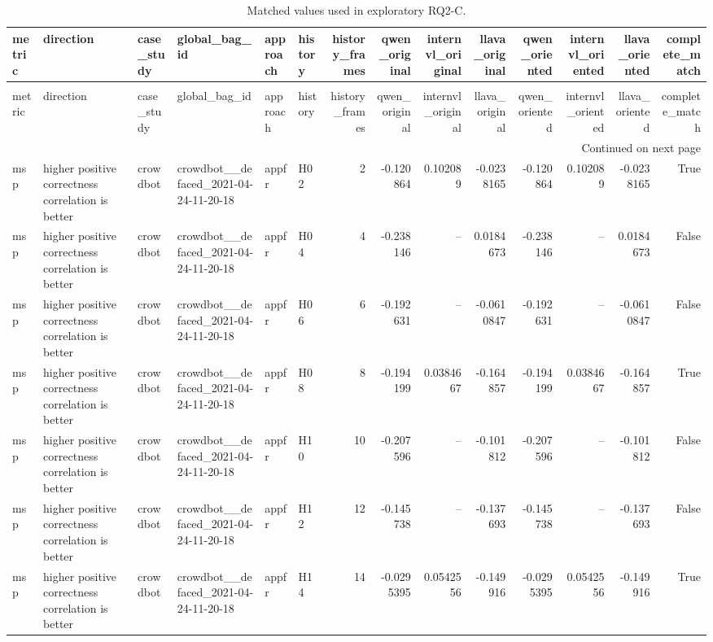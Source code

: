 \begin{longtable}{llllllrrrrrrrr}
\caption{Matched values used in exploratory RQ2-C.} \label{tab:rq2c-matched-values} \\
\toprule
metric & direction & case\_study & global\_bag\_id & approach & history & history\_frames & qwen\_original & internvl\_original & llava\_original & qwen\_oriented & internvl\_oriented & llava\_oriented & complete\_match \\
\midrule
\endfirsthead
\caption[]{Matched values used in exploratory RQ2-C.} \\
\toprule
metric & direction & case\_study & global\_bag\_id & approach & history & history\_frames & qwen\_original & internvl\_original & llava\_original & qwen\_oriented & internvl\_oriented & llava\_oriented & complete\_match \\
\midrule
\endhead
\midrule
\multicolumn{14}{r}{Continued on next page} \\
\midrule
\endfoot
\bottomrule
\endlastfoot
msp & higher positive correctness correlation is better & crowdbot & crowdbot\_\_defaced\_2021-04-24-11-20-18 & appfr & H02 & 2 & -0.120864 & 0.102089 & -0.0238165 & -0.120864 & 0.102089 & -0.0238165 & True \\
msp & higher positive correctness correlation is better & crowdbot & crowdbot\_\_defaced\_2021-04-24-11-20-18 & appfr & H04 & 4 & -0.238146 & -- & 0.0184673 & -0.238146 & -- & 0.0184673 & False \\
msp & higher positive correctness correlation is better & crowdbot & crowdbot\_\_defaced\_2021-04-24-11-20-18 & appfr & H06 & 6 & -0.192631 & -- & -0.0610847 & -0.192631 & -- & -0.0610847 & False \\
msp & higher positive correctness correlation is better & crowdbot & crowdbot\_\_defaced\_2021-04-24-11-20-18 & appfr & H08 & 8 & -0.194199 & 0.0384667 & -0.164857 & -0.194199 & 0.0384667 & -0.164857 & True \\
msp & higher positive correctness correlation is better & crowdbot & crowdbot\_\_defaced\_2021-04-24-11-20-18 & appfr & H10 & 10 & -0.207596 & -- & -0.101812 & -0.207596 & -- & -0.101812 & False \\
msp & higher positive correctness correlation is better & crowdbot & crowdbot\_\_defaced\_2021-04-24-11-20-18 & appfr & H12 & 12 & -0.145738 & -- & -0.137693 & -0.145738 & -- & -0.137693 & False \\
msp & higher positive correctness correlation is better & crowdbot & crowdbot\_\_defaced\_2021-04-24-11-20-18 & appfr & H14 & 14 & -0.0295395 & 0.0542556 & -0.149916 & -0.0295395 & 0.0542556 & -0.149916 & True \\

\end{longtable}
